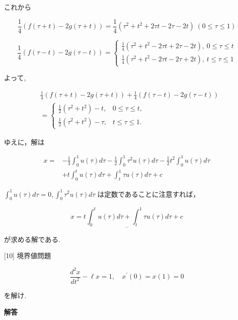 \documentclass{jsarticle}
\begin{document}
これから

$$
\frac{1}{4}(f(\tau+t)-2 g(\tau+t))=\frac{1}{4}\left(\tau^{2}+t^{2}+2 \tau t-2 \tau-2 t\right) \ (0 \leq \tau \leq 1)
$$

$$
\frac{1}{4}(f(\tau-t)-2 g(\tau-t))=\left\{\begin{array}{l}
\frac{1}{4}\left(\tau^{2}+t^{2}-2 \tau t+2 \tau-2 t\right), \ 0 \leq \tau \leq t\\
\frac{1}{4}\left(\tau^{2}+t^{2}-2 \tau t-2 \tau+2 t\right), \ t \leq \tau \leq 1
\end{array}\right.
$$

よって,

$$
\begin{aligned}
& \frac{1}{4}(f(\tau+t)-2 g(\tau+t))+\frac{1}{4}(f(\tau-t)-2 g(\tau-t)) \\
& = \begin{cases}\frac{1}{2}\left(\tau^{2}+t^{2}\right)-t, & 0 \leq \tau \leq t, \\
\frac{1}{2}\left(\tau^{2}+t^{2}\right)-\tau, & t \leq \tau \leq 1 .\end{cases}
\end{aligned}
$$

ゆえに，解は

$$
\begin{aligned}
x= & -\frac{1}{3} \int_{0}^{1} u(\tau) d \tau-\frac{1}{2} \int_{0}^{1} \tau^{2} u(\tau) d \tau-\frac{1}{2} t^{2} \int_{0}^{1} u(\tau) d \tau \\
& +t \int_{0}^{t} u(\tau) d \tau+\int_{t}^{1} \tau u(\tau) d \tau+c
\end{aligned}
$$

$\int_{0}^{1} u(\tau) d \tau=0, \int_{0}^{1} \tau^{2} u(\tau) d \tau$ は定数であることに注意すれば，

$$
\underline{x=t \int_{0}^{t} u(\tau) d \tau+\int_{t}^{1} \tau u(\tau) d \tau+c}
$$

が求める解である.\\

\bigskip
\bigskip

\begin{itembox}[l]{[10]}
境界値問題


\begin{equation*}
\frac{d^{2} x}{d t^{2}}-\ell x=1, \quad x^{\prime}(0)=x(1)=0 \tag{21}
\end{equation*}


を解け.  
\end{itembox}

\textbf{解答}
\end{document}
